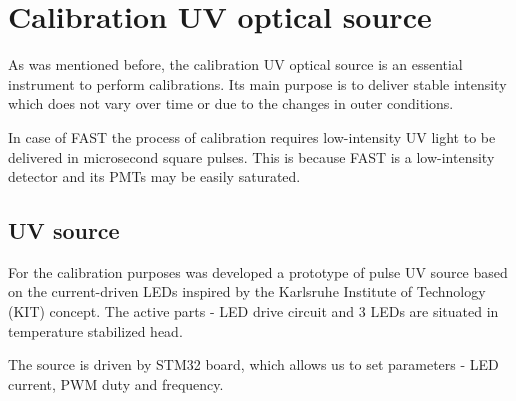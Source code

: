 
\chapter{Calibration UV optical source}
 \label{chap4}
As was mentioned before, the calibration UV optical source is an essential instrument to perform calibrations. Its main purpose is to deliver stable intensity which does not vary over time or due to the changes in outer conditions.
\par
In case of FAST the process of calibration requires low-intensity UV light to be delivered in microsecond square pulses. This is because FAST is a low-intensity detector and its PMTs may be easily saturated.

\section{UV source}
For the calibration purposes was developed a prototype of pulse UV source based on the current-driven LEDs inspired by the Karlsruhe Institute of Technology (KIT) concept. The active parts - LED drive circuit and 3 LEDs are situated in temperature stabilized head. 
\par
The source is driven by STM32 board, which allows us to set parameters - LED current, PWM duty and frequency.
 


